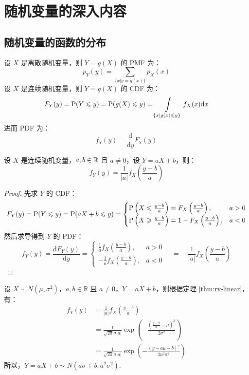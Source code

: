 \section{随机变量的深入内容}

\subsection{随机变量的函数的分布}

\begin{theorem}[随机变量的函数]
设 $X$ 是离散随机变量，则 $Y=g(X)$ 的 PMF 为：
\[p_Y(y)=\sum_{\{x|y=g(x)\}}p_X(x)\]
设 $X$ 是连续随机变量，则 $Y=g(X)$ 的 CDF 为：
\[F_Y(y)=\mathrm{P}(Y\leqslant y)=\mathrm{P}(g(X)\leqslant y)=\int\limits_{\{x|g(x)\leqslant y\}}f_X(x)\mathrm dx\]
进而 PDF 为：
\[f_Y(y)=\frac{\mathrm d}{\mathrm dy}F_Y(y)\]
\end{theorem}

\begin{theorem}[线性函数情形]
\label{thm:rv-linear}
设 $X$ 是连续随机变量，$a,b\in\mathbb{R}$ 且 $a\neq0$，设 $Y=aX+b$，则：
\[f_Y(y)=\frac{1}{|a|}f_X\left(\frac{y-b}{a}\right)\]
\end{theorem}
\begin{proof}
先求 $Y$ 的 CDF：
\[F_Y(y)=\mathrm{P}(Y\leqslant y)=\mathrm{P}(aX+b\leqslant y)=\begin{cases}\mathrm{P}\left(X\leqslant \frac{y-b}{a}\right)=F_X\left(\frac{y-b}{a}\right),&a>0\\\mathrm{P}\left(X\geqslant \frac{y-b}{a}\right)=1-F_X\left(\frac{y-b}{a}\right),&a<0\end{cases}\]
然后求导得到 $Y$ 的 PDF：
\[f_Y(y)=\frac{\mathrm dF_Y(y)}{\mathrm dy}=\begin{cases}\frac{1}{a}f_X\left(\frac{y-b}{a}\right),&a>0\\-\frac{1}{a}f_X\left(\frac{y-b}{a}\right),&a<0\end{cases}\quad=\quad\frac{1}{|a|}f_X\left(\frac{y-b}{a}\right)\]
\end{proof}

\begin{example}[正态分布的线性变换仍然是正态分布]
设 $X\sim N(\mu,\sigma^2)$，$a,b\in\mathbb R$ 且 $a\neq0$，$Y=aX+b$，则根据定理 \ref{thm:rv-linear}，有：
\begin{align*}
f_{Y}(y)&=\frac{1}{|a|}f_X\left(\frac{y-b}{a}\right)\\
&=\frac{1}{\sqrt{2\pi}\sigma|a|}\exp\left({-\frac{\left(\frac{y-b}{a}-\mu\right)^2}{2\sigma^2}}\right)\\
&=\frac{1}{\sqrt{2\pi}\sigma|a|}\exp\left({-\frac{(y-a\mu-b)^2}{2a^2\sigma^2}}\right)
\end{align*}
所以，$Y=aX+b\sim N(a\sigma+b,a^2\sigma^2)$.
\end{example}

